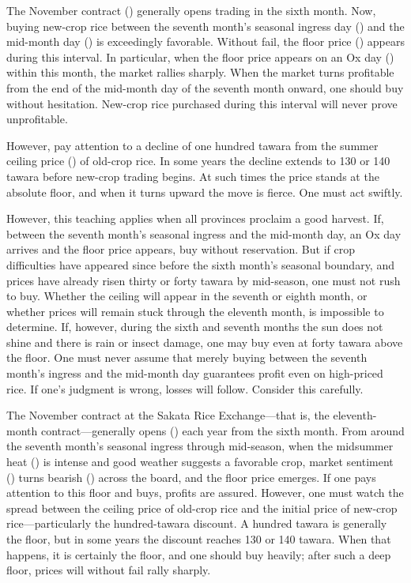 \begin{sokyubox}
{\small\itshape\color{sokyubar} }

\medskip
The November contract () generally opens
trading in the sixth month. Now, buying new-crop rice between the seventh
month's seasonal ingress day () and the mid-month
day () is exceedingly favorable. Without fail,
the floor price () appears during this interval.
In particular, when the floor price appears on an Ox day
() within this month, the market rallies sharply.
When the market turns profitable from the end of the mid-month day of the
seventh month onward, one should buy without hesitation. New-crop rice
purchased during this interval will never prove unprofitable.

However, pay attention to a decline of one hundred tawara from the summer
ceiling price () of old-crop rice. In some years
the decline extends to 130 or 140 tawara before new-crop trading begins.
At such times the price stands at the absolute floor, and when it turns
upward the move is fierce. One must act swiftly.

However, this teaching applies when all provinces proclaim a good harvest.
If, between the seventh month's seasonal ingress and the mid-month day,
an Ox day arrives and the floor price appears, buy without reservation.
But if crop difficulties have appeared since before the sixth month's
seasonal boundary, and prices have already risen thirty or forty tawara by
mid-season, one must not rush to buy. Whether the ceiling will appear in
the seventh or eighth month, or whether prices will remain stuck through
the eleventh month, is impossible to determine. If, however, during the
sixth and seventh months the sun does not shine and there is rain or
insect damage, one may buy even at forty tawara above the floor. One must
never assume that merely buying between the seventh month's ingress and
the mid-month day guarantees profit even on high-priced rice. If one's
judgment is wrong, losses will follow. Consider this carefully.
\end{sokyubox}

\commentary
The November contract at the Sakata Rice Exchange---that is, the
eleventh-month contract---generally opens () each year
from the sixth month. From around the seventh month's seasonal ingress
through mid-season, when the midsummer heat () is
intense and good weather suggests a favorable crop, market sentiment
() turns bearish () across the board,
and the floor price emerges. If one pays attention to this floor and buys,
profits are assured. However, one must watch the spread between the
ceiling price of old-crop rice and the initial price of new-crop
rice---particularly the hundred-tawara discount. A hundred tawara is
generally the floor, but in some years the discount reaches 130 or 140
tawara. When that happens, it is certainly the floor, and one should buy
heavily; after such a deep floor, prices will without fail rally sharply.

